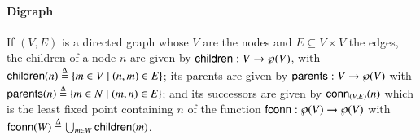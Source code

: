 \paragraph*{Digraph}
If $(V,E)$ is a directed graph whose $V$ are the nodes and $E \subseteq V\times V$ the edges,
the children of a node $n$ are given by
$\mathsf{children}: V \to \wp(V)$, with
$\mathsf{children}(n) \stackrel{\Delta}= \{ m\in V\mid (n,m)\in E\}$;
its parents are given by
$\mathsf{parents}: V \to \wp(V)$ with
$\mathsf{parents}(n) \stackrel{\Delta}= \{ m\in N\mid (m,n)\in E\}$;
and its successors are given by
$\mathsf{conn}_{(V,E)}(n)$ which is the least fixed point containing $n$
of the function
$\mathsf{f}\mathsf{conn}:\wp(V)\to \wp(V)$
with $\mathsf{f}\mathsf{conn}(W) \stackrel{\Delta}= \bigcup_{m\in W} \mathsf{children}(m)$.


